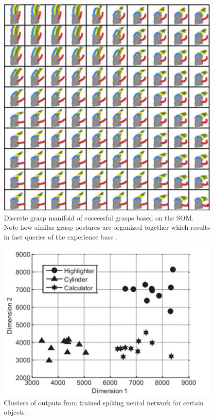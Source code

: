 \begin{figure}[hbt]
	\centering
	\includegraphics[width=\linewidth]{images/grasp_som}
	\caption{Discrete grasp manifold of successful grasps based on the SOM.
Note how similar grasp postures are organized together which results in fast queries of the experience base \cite{steffen2007experience}.}
	\label{fig:grasp_som}
\end{figure}

\begin{figure}[hbt]
	\centering
	\includegraphics[width=\linewidth]{images/sensory_clustering}
	\caption{Clusters of outputs from trained spiking neural network for certain objects \cite{ratnasingam2011spiking}.}
	\label{fig:sensory_clustering}
\end{figure}

